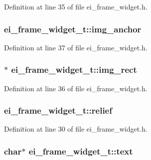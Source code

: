 Definition at line 35 of file ei\-\_\-frame\-\_\-widget.\-h.

\hypertarget{structei__frame__widget__t_aaaf211e8637c20e80723009615f625a9}{
\subsubsection[{img\-\_\-anchor}]{ ei\-\_\-frame\-\_\-widget\-\_\-t\-::img\-\_\-anchor}}\label{structei__frame__widget__t_aaaf211e8637c20e80723009615f625a9}


Definition at line 37 of file ei\-\_\-frame\-\_\-widget.\-h.

\hypertarget{structei__frame__widget__t_a0e3772cc22eb4339b9a1c12b0cbd6667}{
\subsubsection[{img\-\_\-rect}]{$\ast$ ei\-\_\-frame\-\_\-widget\-\_\-t\-::img\-\_\-rect}}\label{structei__frame__widget__t_a0e3772cc22eb4339b9a1c12b0cbd6667}


Definition at line 36 of file ei\-\_\-frame\-\_\-widget.\-h.

\hypertarget{structei__frame__widget__t_a23ba21889e590728603484c0e4728c8e}{
\subsubsection[{relief}]{ ei\-\_\-frame\-\_\-widget\-\_\-t\-::relief}}\label{structei__frame__widget__t_a23ba21889e590728603484c0e4728c8e}


Definition at line 30 of file ei\-\_\-frame\-\_\-widget.\-h.

\hypertarget{structei__frame__widget__t_affbafa0c71029ba42c4173d665593ccd}{
\subsubsection[{text}]{\setlength{\rightskip}{0pt plus 5cm}char$\ast$ ei\-\_\-frame\-\_\-widget\-\_\-t\-::text}}\label{structei__frame__widget__t_affbafa0c71029ba42c4173d665593ccd}


